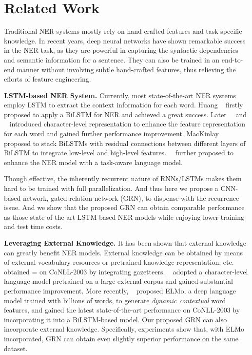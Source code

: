 \documentclass[letterpaper]{article} \usepackage{aaai19}  \usepackage{times}  \usepackage{helvet}  \usepackage{courier}  \usepackage{url}  \usepackage{graphicx}  \usepackage{amsmath}
\newcommand{\etal}{\text{et al.}}
\newcommand{\ie}{\text{i.e.,}}
\newcommand{\GRN}{GRN}
\begin{document}
\section{Related Work}
Traditional NER systems mostly rely on hand-crafted features and task-specific knowledge. In recent years, deep neural networks have shown remarkable success in the NER task, as they are powerful in capturing the syntactic dependencies and semantic information for a sentence. They can also be trained in an end-to-end manner without involving subtle hand-crafted features, thus relieving the efforts of feature engineering.

\textbf{LSTM-based NER System.} Currently, most state-of-the-art NER systems employ LSTM to extract the context information for each word. Huang \etal~ firstly proposed to apply a BiLSTM for NER and achieved a great success. Later~\citeauthor{ma2016CNNBLSTMCRF}~ and \citeauthor{chiu2016named}~ introduced character-level representation to enhance the feature representation for each word and gained further performance improvement. MacKinlay \etal~ proposed to stack BiLSTMs with residual connections between different layers of BiLSTM to integrate low-level and high-level features.~\citeauthor{Liu2018Empower}~ further proposed to enhance the NER model with a task-aware language model.

Though effective, the inherently recurrent nature of RNNs/LSTMs makes them hard to be trained with full parallelization. And thus here we propose a CNN-based network, \ie{} gated relation network (\GRN{}), to dispense with the recurrence issue. And we show that the proposed \GRN{} can obtain comparable performance as those state-of-the-art LSTM-based NER models while enjoying lower training and test time costs.

\textbf{Leveraging External Knowledge.} It has been shown that external knowledge can greatly benefit NER models. External knowledge can be obtained by means of external vocabulary resources or pretrained knowledge representation, etc. \citeauthor{chiu2016named}~ obtained = on CoNLL-2003 by integrating gazetteers. \citeauthor{peters2017semi}~ adopted a character-level language model pretrained on a large external corpus and gained substantial performance improvement. More recently, \citeauthor{peters2018deep}~ proposed ELMo, a deep language model trained with billions of words, to generate \textit{dynamic contextual} word features, and gained the latest state-of-the-art performance on CoNLL-2003 by incorporating it into a BiLSTM-based model. Our proposed \GRN{} can also incorporate external knowledge. Specifically, experiments show that, with ELMo incorporated, \GRN{} can obtain even slightly superior performance on the same dataset.
\end{document}
